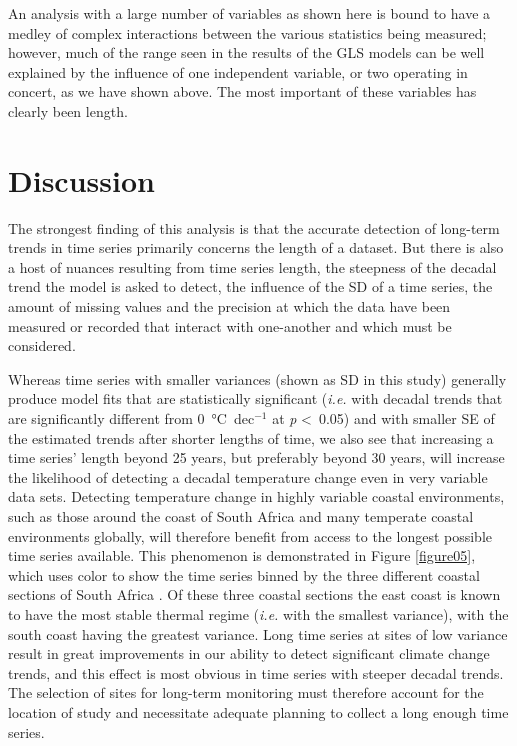 \documentclass[]{ametsoc}
\begin{document}
An analysis with a large number of variables as shown here is bound to have a medley of complex interactions between the various statistics being measured; however, much of the range seen in the results of the GLS models can be well explained by the influence of one independent variable, or two operating in concert, as we have shown above. The most important of these variables has clearly been length.

\section{Discussion}
The strongest finding of this analysis is that the accurate detection of long-term trends in time series primarily concerns the length of a dataset. But there is also a host of nuances resulting from time series length, the steepness of the decadal trend the model is asked to detect, the influence of the SD of a time series, the amount of missing values and the precision at which the data have been measured or recorded that interact with one-another and which must be considered.

Whereas time series with smaller variances (shown as SD in this study) generally produce model fits that are statistically significant (\emph{i.e.} with decadal trends that are significantly different from \SI{0}{\degreeCelsius}~dec$^{-1}$ at \emph{p} \textless~0.05) and with smaller SE of the estimated trends after shorter lengths of time, we also see that increasing a time series' length beyond 25 years, but preferably beyond 30 years, will increase the likelihood of detecting a decadal temperature change even in very variable data sets. Detecting temperature change in highly variable coastal environments, such as those around the coast of South Africa and many temperate coastal environments globally, will therefore benefit from access to the longest possible time series available. This phenomenon is demonstrated in Figure \ref{figure05}, which uses color to show the time series binned by the three different coastal sections of South Africa \citep{Smit2013}. Of these three coastal sections the east coast is known to have the most stable thermal regime (\emph{i.e.} with the smallest variance), with the south coast having the greatest variance. Long time series at sites of low variance result in great improvements in our ability to detect significant climate change trends, and this effect is most obvious in time series with steeper decadal trends. The selection of sites for long-term monitoring must therefore account for the location of study and necessitate adequate planning to collect a long enough time series.
\end{document}

